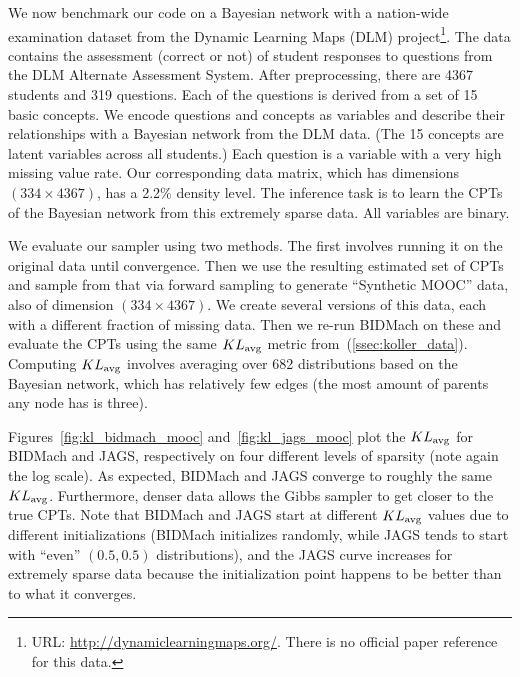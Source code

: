 \documentclass{article} %
\begin{document}
We now benchmark our code on a Bayesian network with a nation-wide examination dataset from the
Dynamic Learning Maps (DLM) project\footnote{URL: \url{http://dynamiclearningmaps.org/}. There is no
official paper reference for this data.}. The data contains the assessment (correct or not) of
student responses to questions from the DLM Alternate Assessment System. After preprocessing, there
are 4367 students and 319 questions. Each of the questions is derived from a set of 15 basic
concepts. We encode questions and concepts as variables and describe their relationships with a
Bayesian network from the DLM data. (The 15 concepts are latent variables across all students.) Each
question is a variable with a very high missing value rate.  Our corresponding data matrix, which
has dimensions $(334\times 4367)$, has a 2.2\% density level. The inference task is to learn the
CPTs of the Bayesian network from this extremely sparse data. All variables are binary.

We evaluate our sampler using two methods. The first involves running it on the original data until
convergence. Then we use the resulting estimated set of CPTs and sample from that via forward
sampling to generate ``Synthetic MOOC'' data, also of dimension $(334 \times 4367)$. We create
several versions of this data, each with a different fraction of missing data. Then we re-run
BIDMach on these and evaluate the CPTs using the same $KL_{\rm avg}$ metric
from~(\ref{ssec:koller_data}). Computing $KL_{\rm avg}$ involves averaging over 682 distributions
based on the Bayesian network, which has relatively few edges (the most amount of parents any node
has is three).

Figures~\ref{fig:kl_bidmach_mooc} and~\ref{fig:kl_jags_mooc} plot the $KL_{\rm avg}$ for BIDMach and
JAGS, respectively on four different levels of sparsity (note again the log scale). As expected,
BIDMach and JAGS converge to roughly the same $KL_{\rm avg}$. Furthermore, denser data allows
the Gibbs sampler to get closer to the true CPTs. Note that BIDMach and JAGS start at different
$KL_{\rm avg}$ values due to different initializations (BIDMach initializes randomly, while JAGS
tends to start with ``even'' $(0.5,0.5)$ distributions), and the JAGS curve increases for extremely
sparse data because the initialization point happens to be better than to what it converges.
\end{document}
